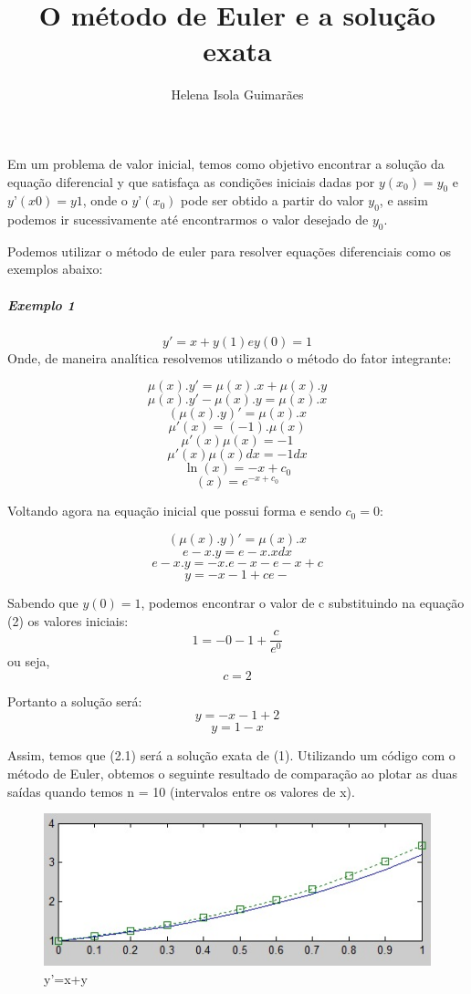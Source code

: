 \documentclass[]{article}
\title{O método de Euler e a solução exata}
\author{Helena Isola Guimarães}
\begin{document}
\maketitle
Em um problema de valor inicial, temos como objetivo encontrar a solução da equação diferencial y que 
satisfaça as condições iniciais dadas por $y(x_0)=y_0$ e $y’(x0)=y1$, onde o $y’(x_0)$ pode ser obtido a 
partir do valor $y_0$, e assim podemos ir sucessivamente até encontrarmos o valor desejado de $y_0$. 

Podemos utilizar o método de euler para resolver equações diferenciais como os exemplos abaixo:

\subparagraph*{Exemplo 1}
\begin{equation}
    y' = x + y  (1)  e  y(0) = 1
\end{equation}
Onde, de maneira analítica resolvemos utilizando o método do fator integrante:

\[\mu (x).y' = \mu (x).x + \mu (x).y\]
\[\mu (x).y' - \mu (x).y = \mu (x).x \]
\[(\mu (x).y)' = \mu (x).x\]
\[\mu '(x) =(-1). \mu (x)\]
\[\mu '(x)\mu (x) = -1\]
\[\mu '(x)\mu (x)dx = -1 dx\]
\[\ln (x) = -x +c_0\]
\[(x) = e^{-x+c_0}\]

Voltando agora na equação inicial que possui forma e sendo $c_0 = 0$:

\[(\mu (x).y)' = \mu (x).x\]
\[ e-x.y  = e-x.x dx \]
\[e-x.y  = -x.e-x - e-x+c\]
\[y = -x -1 + ce-\]

Sabendo que $y(0) = 1$, podemos encontrar o valor de c substituindo na equação (2) os valores iniciais:
\[1 = - 0 -1 + \frac{c}{e^0}\] 		
ou seja,  \[c = 2\]

Portanto a solução será:
\[y = -x -1 + 2 \]
\[y = 1 - x  \]

Assim, temos que (2.1) será a solução exata de (1). Utilizando um código com o método de Euler, obtemos o seguinte resultado de comparação ao plotar as duas saídas quando temos n = 10 (intervalos entre os valores de x).

\begin{figure}
    \includegraphics[width=\linewidth]{euler1.jpeg}
    \caption{y'=x+y}
    \label{fig:euler1}
\end{figure}
\end{document}
